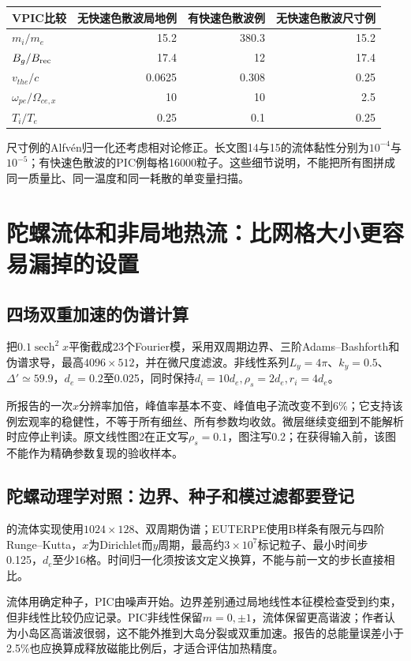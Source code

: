 \begin{center}\small
\begin{tabular}{lrrr}\toprule
VPIC比较 & 无快速色散波局地例 & 有快速色散波例 & 无快速色散波尺寸例\\\midrule
$m_i/m_e$ &15.2&380.3&15.2\\
$B_g/B_{\rm rec}$ &17.4&12&17.4\\
$v_{the}/c$ &0.0625&0.308&0.25\\
$\omega_{pe}/\Omega_{ce,x}$ &10&10&2.5\\
$T_i/T_e$ &0.25&0.1&0.25\\\bottomrule
\end{tabular}\end{center}
尺寸例的Alfvén归一化还考虑相对论修正。长文图14与15的流体黏性分别为$10^{-4}$与$10^{-5}$；有快速色散波的PIC例每格16000粒子。这些细节说明，不能把所有图拼成同一质量比、同一温度和同一耗散的单变量扫描。\citep{L216,L217}

\section{陀螺流体和非局地热流：比网格大小更容易漏掉的设置}
\subsection{四场双重加速的伪谱计算}
\citet{F672}把$0.1\operatorname{sech}^2x$平衡截成23个Fourier模，采用双周期边界、三阶Adams--Bashforth和伪谱求导，最高$4096\times512$，并在微尺度滤波。非线性系列$L_y=4\pi$、$k_y=0.5$、$\Delta'\simeq59.9$，$d_e=0.2$至0.025，同时保持$d_i=10d_e,\rho_s=2d_e,r_i=4d_e$。

所报告的一次$x$分辨率加倍，峰值率基本不变、峰值电子流改变不到6\%；它支持该例宏观率的稳健性，不等于所有细丝、所有参数均收敛。微层继续变细到不能解析时应停止判读。原文线性图2在正文写$\rho_s=0.1$，图注写0.2；在获得输入前，该图不能作为精确参数复现的验收样本。

\subsection{陀螺动理学对照：边界、种子和模过滤都要登记}
\citet{E475}的流体实现使用$1024\times128$、双周期伪谱；EUTERPE使用B样条有限元与四阶Runge--Kutta，$x$为Dirichlet而$y$周期，最高约$3\times10^7$标记粒子、最小时间步0.125，$d_e$至少16格。时间归一化须按该文定义换算，不能与前一文的步长直接相比。

流体用确定种子，PIC由噪声开始。边界差别通过局地线性本征模检查受到约束，但非线性比较仍应记录。PIC非线性保留$m=0,\pm1$，流体保留更高谐波；作者认为小岛区高谐波很弱，这不能外推到大岛分裂或双重加速。报告的总能量误差小于2.5\%也应换算成释放磁能比例后，才适合评估加热精度。

